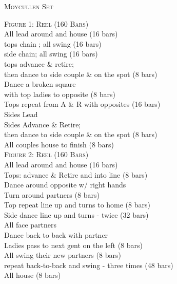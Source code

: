 \begin{center}
\textsc{Moycullen Set} \\
\end{center}


\small \textsc{Figure 1: Reel (160 Bars)}\\


\bodyText
All lead around and house (16 bars)\\
tops chain ; all swing (16 bars)\\
side chain; all swing (16 bars)\\
tops advance \& retire; \\
then dance to side couple \& on the spot (8 bars)\\
Dance a broken square\\
with top ladies to opposite  (8 bars)\\
Tops repeat from A \& R with opposites (16 bars)\\
Sides Lead \\
Sides Advance \& Retire; \\
then dance to side couple \& on the spot (8 bars)\\
All couples house to finish (8 bars)\\

\small \textsc{Figure 2: Reel (160 Bars)}\\

\bodyText
All lead around  and house (16 bars)\\
Tops: advance \& Retire and into line (8 bars)\\
Dance around opposite w/ right hands\\
Turn around partners (8 bars)\\
Top repeat line up and turns to home (8 bars)\\
Side dance line up and turns - twice  (32 bars)\\
All face partners\\
Dance back to back with partner\\
Ladies pass to next gent on the left (8 bars)\\
All swing their new partners (8 bars)\\
repeat back-to-back and swing - three times  (48 bars)\\
All house (8 bars)
